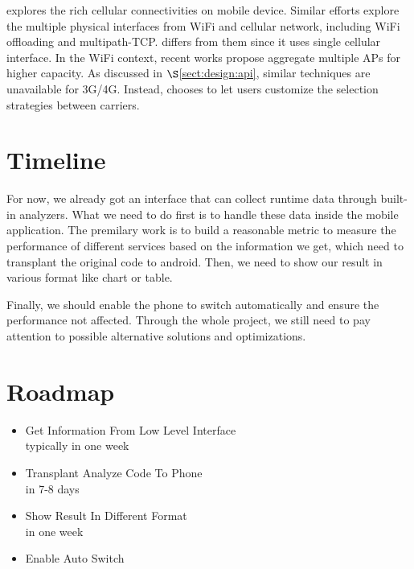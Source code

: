 \documentclass{./template/sig-alternate-10pt-tight}
\begin{document}
\begin{sloppypar}
\icellular explores the rich cellular connectivities on mobile device.
Similar efforts explore the multiple physical interfaces from WiFi and cellular network, including WiFi offloading\cite{deng2014wifi,balasubramanian10-offloading,dimatteo11-offloading} and multipath-TCP\cite{paasch12-cellnet,wischik2011design}.
\icellular differs from them since it uses single cellular interface.
In the WiFi context, recent works\cite{bejerano2006mifi,croitoru2015towards,kandula2008fatvap} propose aggregate multiple APs for higher capacity.
As discussed in $\S$\ref{sect:design:api}, similar techniques are unavailable for 3G/4G.
Instead, \icellular chooses to let users customize the selection strategies between carriers.

\section{Timeline}
For now, we already got an interface that can collect runtime data through built-in analyzers. What we need to do first is to handle these data inside the mobile application. The premilary work is to build 
a reasonable metric to measure the performance of different services based on the information we get, which need to transplant the original code to android. Then, we need to show our result in various format like chart or table. 

Finally, we should enable the phone to switch automatically and ensure the performance not affected. Through the whole project, we still need to pay attention to possible alternative solutions and optimizations.

\section{Roadmap}

\begin{itemize}
\item Get Information From Low Level Interface\\
	typically in one week
\item Transplant Analyze Code To Phone\\
	in 7-8 days
\item Show Result In Different Format\\
	in one week
\item Enable Auto Switch
	

\end{itemize}
\end{sloppypar}
\end{document}
